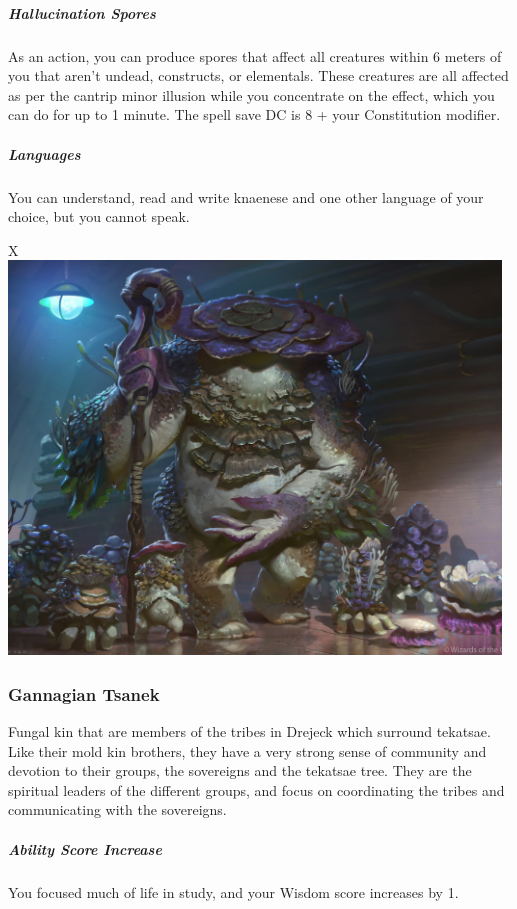     \subparagraph{Hallucination Spores} As an action, you can produce spores that affect all creatures within 6 meters of you that aren't undead, constructs, or elementals.
    These creatures are all affected as per the cantrip minor illusion while you concentrate on the effect, which you can do for up to 1 minute.
    The spell save DC is 8 + your Constitution modifier.

    \subparagraph{Languages} You can understand, read and write knaenese and one other language of your choice, but you cannot speak.

\begin{table}[b]%
    \begin{DndTable}[width=\linewidth]{X}
        \includegraphics[width=0.98\textwidth]{04kins/img/16tsanek_sovereign.jpg}
    \end{DndTable}
\end{table}

\subsubsection{Gannagian Tsanek}
    Fungal kin that are members of the tribes in Drejeck which surround tekatsae.
    Like their mold kin brothers, they have a very strong sense of community and devotion to their groups, the sovereigns and the tekatsae tree.
    They are the spiritual leaders of the different groups, and focus on coordinating the tribes and communicating with the sovereigns.

    \subparagraph{Ability Score Increase} You focused much of life in study, and your Wisdom score increases by 1.

